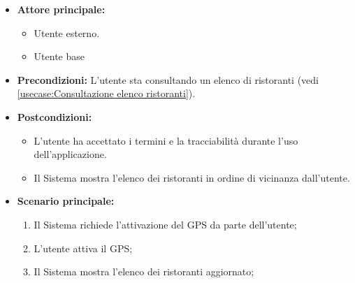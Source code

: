 \label{usecase:Abilitazione GPS}
\begin{itemize}
	\item \textbf{Attore principale:}
    \begin{itemize}
        \item Utente esterno.
        \item Utente base
    \end{itemize}
	
	\item \textbf{Precondizioni:} L'utente sta consultando un elenco di ristoranti (vedi \autoref{usecase:Consultazione elenco ristoranti}).

	\item \textbf{Postcondizioni:}
    \begin{itemize}
        \item L'utente ha accettato i termini e la tracciabilità durante l'uso dell'applicazione.
        \item Il Sistema mostra l'elenco dei ristoranti in ordine di vicinanza dall'utente.
    \end{itemize}
	      
	\item \textbf{Scenario principale:}
	      \begin{enumerate}
		      \item Il Sistema richiede l'attivazione del GPS da parte dell'utente;

		      \item L'utente attiva il GPS;

		      \item Il Sistema mostra l'elenco dei ristoranti aggiornato;
	      \end{enumerate}

\end{itemize}

